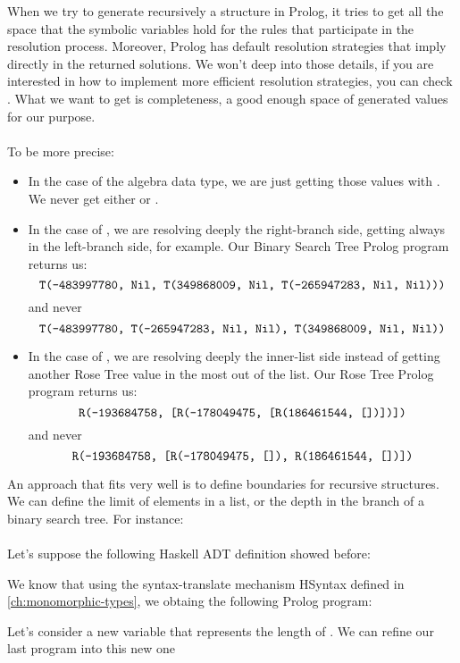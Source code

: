When we try to generate recursively a structure in Prolog, it tries to get all the space that the symbolic variables hold for the rules that participate in the resolution process. Moreover, Prolog has default resolution strategies that imply directly in the returned solutions. We won't deep into those details, if you are interested in how to implement more efficient resolution strategies, you can check \cite{effgenttransf}. What we want to get is completeness, a good enough space of generated values for our purpose.\\\\
To be more precise:
\begin{itemize}
	\item In the case of the  algebra data type, we are just getting those values with . We never get either  or .
	\item In the case of , we are resolving deeply the right-branch side, getting always  in the left-branch side, for example. Our Binary Search Tree Prolog program returns us: $$\texttt{T(-483997780, Nil, T(349868009, Nil, T(-265947283, Nil, Nil)))}$$ and never $$\texttt{T(-483997780, T(-265947283, Nil, Nil), T(349868009, Nil, Nil))}$$
	\item In the case of , we are resolving deeply the inner-list side instead of getting another Rose Tree value in the most out of the list. Our Rose Tree Prolog program returns us: $$\texttt{R(-193684758, [R(-178049475, [R(186461544, [])])])}$$ and never $$\texttt{R(-193684758, [R(-178049475, []), R(186461544, [])])}$$
\end{itemize}
An approach that fits very well is to define boundaries for recursive structures. We can define the limit of elements in a list, or the depth in the branch of a binary search tree. For instance:\\\\
Let's suppose the following Haskell ADT definition showed before:

We know that using the syntax-translate mechanism HSyntax defined in \ref{ch:monomorphic-types}, we obtaing the following Prolog program:

Let's consider a new variable  that represents the length of . We can refine our last program into this new one
